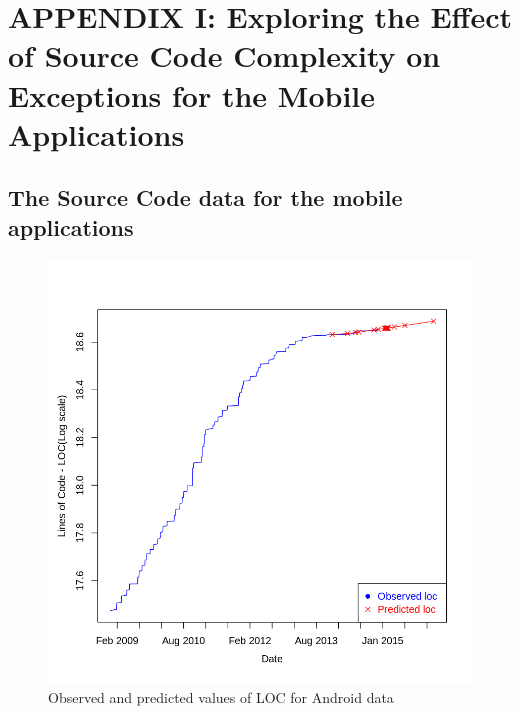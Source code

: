 \documentclass[smallcondensed]{svjour3}     %
\begin{document}

\section*{APPENDIX I: Exploring the Effect of Source Code Complexity on Exceptions for the Mobile Applications}\label{app1}

\subsection*{The Source Code data for the mobile applications}


\begin{figure}[!t]
\centering
\includegraphics[width=0.75\linewidth]{loc}
\vspace{-10pt}
\caption{Observed and predicted values of LOC for Android data}
\label{fig:LOC}
\vspace{-10pt}
\end{figure}
\end{document}
